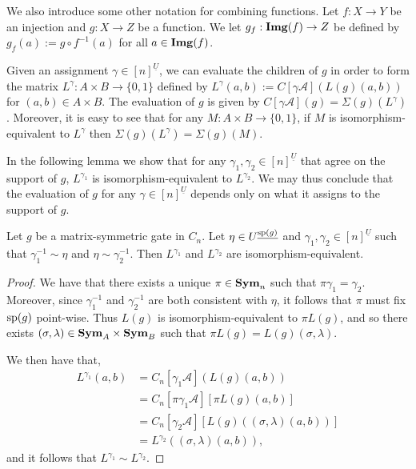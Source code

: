 \documentclass[../paper.tex]{subfiles}
\begin{document}
We also introduce some other notation for combining functions. Let $f: X
\rightarrow Y$ be an injection and $g: X \rightarrow Z$ be a function. We let
$g_f : \text{\textbf{Img}}(f) \rightarrow Z$ be defined by $g_f(a) := g \circ f^{-1}(a)$ for
all $a \in \text{\textbf{Img}}(f)$.

Given an assignment $\gamma \in [n]^{\underline{U}}$, we can evaluate the
children of $g$ in order to form the matrix $L^{\gamma} : A \times B \rightarrow
\{0,1\}$ defined by $L^{\gamma} (a,b) := C[\gamma \mathcal{A}](L(g)(a,b))$ for
$(a,b) \in A \times B$. The evaluation of $g$ is given by $C[\gamma
\mathcal{A}](g) = \Sigma(g) (L^{\gamma})$. Moreover, it is easy to see that for
any $M : A \times B \rightarrow \{0,1\}$, if $M$ is isomorphism-equivalent to
$L^{\gamma}$ then $\Sigma(g)(L^\gamma) = \Sigma (g) (M)$.

In the following lemma we show that for any $\gamma_1, \gamma_2 \in
[n]^{\underline{U}}$ that agree on the support of $g$, $L^{\gamma_1}$ is
isomorphism-equivalent to $L^{\gamma_2}$. We may thus conclude that the
evaluation of $g$ for any $\gamma \in [n]^{\underline{U}}$ depends only on what
it assigns to the support of $g$.

\begin{lem}
	Let $g$ be a matrix-symmetric gate in $C_n$. Let $\eta \in
  U^{\underline{\text{sp}(g)}}$ and $\gamma_1, \gamma_2 \in [n]^{\underline{U}}$
  such that $\gamma^{-1}_1 \sim \eta$ and $\eta \sim \gamma^{-1}_2$. Then
  $L^{\gamma_1}$ and $L^{\gamma_2}$ are isomorphism-equivalent.
	\label{lem:support-determines-evaluation}
\end{lem}

\begin{proof}
	We have that there exists a unique $\pi \in \text{\textbf{Sym}}_n$ such that $\pi \gamma_1 =
  \gamma_2$. Moreover, since $\gamma^{-1}_1$ and $\gamma^{-1}_2$ are both
  consistent with $\eta$, it follows that $\pi$ must fix $\text{sp}(g)$ point-wise.
  Thus $L(g)$ is isomorphism-equivalent to $\pi L(g)$, and so there exists
  $(\sigma, \lambda) \in \text{\textbf{Sym}}_A \times \text{\textbf{Sym}}_B$ such that $\pi L(g) = L(g)
  (\sigma, \lambda)$.
		
	We then have that,
	\begin{align*}
		L^{\gamma_1} (a,b) & = C_n[\gamma_1 \mathcal{A}](L(g)(a,b))                    \\
		                   & = C_n[\pi \gamma_1 \mathcal{A}][\pi L(g)(a,b)]            \\
		                   & = C_n[\gamma_2 \mathcal{A}][L(g)((\sigma, \lambda)(a,b))] \\
		                   & = L^{\gamma_2} ((\sigma, \lambda) (a,b)),                 
	\end{align*}
	and it follows that $L^{\gamma_1} \sim L^{\gamma_2}$.
\end{proof}
\end{document}
